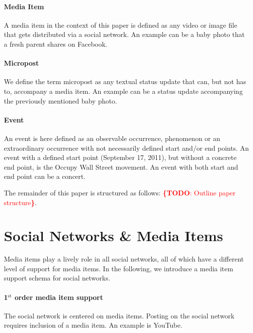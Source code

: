 \documentclass{acm_proc_article-sp}
\newcommand{\todo}[1]{\noindent\textcolor{red}{{\bf \{TODO}: #1{\bf \}}}}
\newcommand{\superscript}[1]{\ensuremath{^{\textrm{#1}}}}
\newcommand{\st}[0]{\superscript{st}}
\begin{document}
\paragraph{Media Item}
A media item in the context of this paper is defined as any video or image file that gets distributed via a social network.
An example can be a baby photo that a fresh parent shares on Facebook. 

\paragraph{Micropost}
We define the term micropost as any textual status update that can,
but not has to,
accompany a media item.
An example can be a status update accompanying the previously mentioned baby photo. %
\paragraph{Event}
An event is here defined as an observable occurrence, phenomenon or an extraordinary occurrence with not necessarily defined start and/or end points.
An event with a defined start point (September 17, 2011), but without a concrete end point, is the Occupy Wall Street movement.
An event with both start and end point can be a concert.

The remainder of this paper is structured as follows: \todo{Outline paper structure}.

\section{Social Networks \& Media Items}
Media items play a lively role in all social networks,
all of which have a different level of support for media items.
In the following, we introduce a media item support schema for social networks.

\paragraph{1{\st} order media item support}
The social network is centered on media items.
Posting on the social network requires inclusion of a media item.
An example is YouTube.
\end{document}
